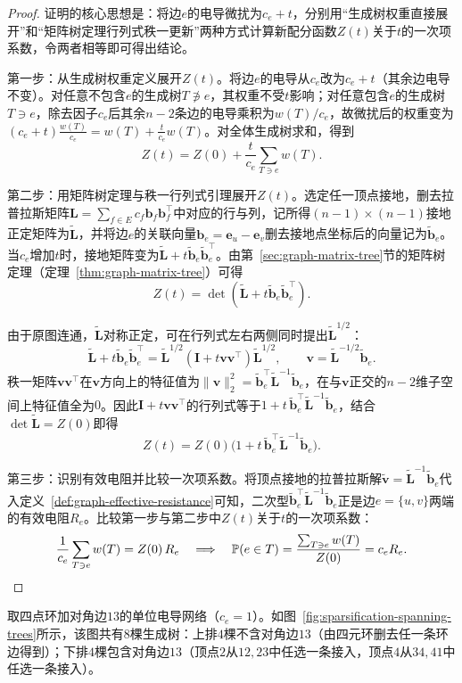 \begin{proof}
证明的核心思想是：将边$e$的电导微扰为$c_e+t$，分别用“生成树权重直接展开”和“矩阵树定理行列式秩一更新”两种方式计算新配分函数$Z(t)$关于$t$的一次项系数，令两者相等即可得出结论。

第一步：从生成树权重定义展开$Z(t)$。将边$e$的电导从$c_e$改为$c_e+t$（其余边电导不变）。对任意不包含$e$的生成树$T\not\ni e$，其权重不受$t$影响；对任意包含$e$的生成树$T\ni e$，除去因子$c_e$后其余$n-2$条边的电导乘积为$w(T)/c_e$，故微扰后的权重变为$(c_e+t)\frac{w(T)}{c_e}=w(T)+\frac{t}{c_e}w(T)$。对全体生成树求和，得到
\[
Z(t)=Z(0)+\frac{t}{c_e}\sum_{T\ni e}w(T).
\]

第二步：用矩阵树定理与秩一行列式引理展开$Z(t)$。选定任一顶点接地，删去拉普拉斯矩阵$\bm L=\sum_{f\in E}c_f\bm b_f\bm b_f^\top$中对应的行与列，记所得$(n-1)\times(n-1)$接地正定矩阵为$\widetilde{\bm L}$，并将边$e$的关联向量$\bm b_e=\bm e_u-\bm e_v$删去接地点坐标后的向量记为$\tilde{\bm b}_e$。当$c_e$增加$t$时，接地矩阵变为$\widetilde{\bm L}+t\tilde{\bm b}_e\tilde{\bm b}_e^\top$。由第~\ref{sec:graph-matrix-tree}节的矩阵树定理（定理~\ref{thm:graph-matrix-tree}）可得
\[
Z(t)=\det(\widetilde{\bm L}+t\tilde{\bm b}_e\tilde{\bm b}_e^\top).
\]

由于原图连通，$\widetilde{\bm L}$对称正定，可在行列式左右两侧同时提出$\widetilde{\bm L}^{1/2}$：
\[
\widetilde{\bm L}+t\tilde{\bm b}_e\tilde{\bm b}_e^\top
=\widetilde{\bm L}^{1/2}
  (\bm I+t\bm v\bm v^\top)\widetilde{\bm L}^{1/2},
\qquad \bm v=\widetilde{\bm L}^{-1/2}\tilde{\bm b}_e.
\]
秩一矩阵$\bm v\bm v^\top$在$\bm v$方向上的特征值为$\lVert\bm v\rVert_2^2=\tilde{\bm b}_e^\top\widetilde{\bm L}^{-1}\tilde{\bm b}_e$，在与$\bm v$正交的$n-2$维子空间上特征值全为$0$。因此$\bm I+t\bm v\bm v^\top$的行列式等于$1+t\,\tilde{\bm b}_e^\top\widetilde{\bm L}^{-1}\tilde{\bm b}_e$，结合$\det\widetilde{\bm L}=Z(0)$即得
\[
Z(t)=Z(0)\bigl(1+t\,\tilde{\bm b}_e^\top\widetilde{\bm L}^{-1}\tilde{\bm b}_e\bigr).
\]

第三步：识别有效电阻并比较一次项系数。将顶点接地的拉普拉斯解$\tilde{\bm v}=\widetilde{\bm L}^{-1}\tilde{\bm b}_e$代入定义~\ref{def:graph-effective-resistance}可知，二次型$\tilde{\bm b}_e^\top\widetilde{\bm L}^{-1}\tilde{\bm b}_e$正是边$e=\{u,v\}$两端的有效电阻$R_e$。比较第一步与第二步中$Z(t)$关于$t$的一次项系数：
\[
\frac{1}{c_e}\sum_{T\ni e}w(T)=Z(0)\,R_e
\quad\Longrightarrow\quad
\mathbb P(e\in T)=\frac{\sum_{T\ni e}w(T)}{Z(0)}=c_e R_e.\qedhere
\]
\end{proof}

\begin{example}[四点五边图的全部生成树与有效电阻核对]
\label{ex:graph-sparsification-trees}
取四点环加对角边$13$的单位电导网络（$c_e=1$）。如图~\ref{fig:sparsification-spanning-trees}所示，该图共有$8$棵生成树：上排$4$棵不含对角边$13$（由四元环删去任一条环边得到）；下排$4$棵包含对角边$13$（顶点$2$从$12,23$中任选一条接入，顶点$4$从$34,41$中任选一条接入）。
\end{example}

